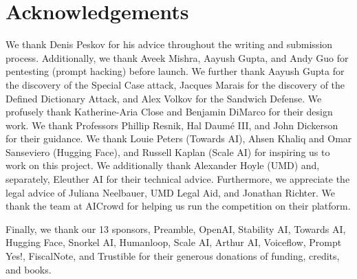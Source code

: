 \section*{Acknowledgements}

We thank Denis Peskov for his advice throughout the writing and submission process. Additionally, we thank Aveek Mishra, Aayush Gupta, and Andy Guo for pentesting (prompt hacking) before launch. We further thank Aayush Gupta for the discovery of the Special Case attack, Jacques Marais for the discovery of the Defined Dictionary Attack, and Alex Volkov for the Sandwich Defense. We profusely thank Katherine-Aria Close and Benjamin DiMarco for their design work. We thank Professors Phillip Resnik, Hal Daumé III, and John Dickerson for their guidance. We thank Louie Peters (Towards AI), Ahsen Khaliq and Omar Sanseviero (Hugging Face), and Russell Kaplan (Scale AI) for inspiring us to work on this project. We additionally thank Alexander Hoyle (UMD) and, separately, Eleuther AI for their technical advice. Furthermore, we appreciate the legal advice of Juliana Neelbauer, UMD Legal Aid, and Jonathan Richter. We thank the team at AICrowd for helping us run the competition on their platform.

Finally, we thank our 13 sponsors, Preamble, OpenAI, Stability AI, Towards AI, Hugging Face, Snorkel AI, Humanloop, Scale AI, Arthur AI, Voiceflow, Prompt Yes!, FiscalNote, and Trustible for their generous donations of funding, credits, and books.

